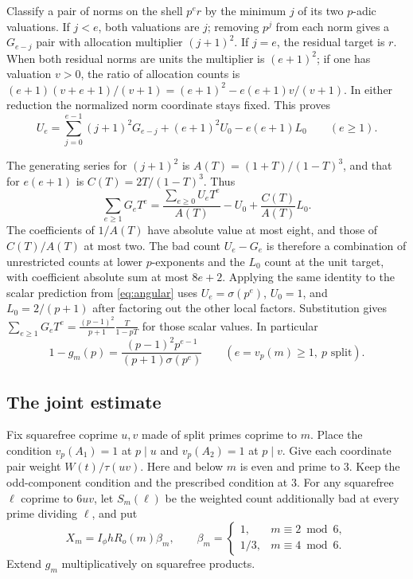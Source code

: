Classify a pair of norms on the shell \(p^e r\) by the minimum
\(j\) of its two \(p\)-adic valuations. If \(j<e\), both valuations
are \(j\); removing \(p^j\) from each norm gives a \(G_{e-j}\)
pair with allocation multiplier \((j+1)^2\). If \(j=e\), the
residual target is \(r\). When both residual norms are units
the multiplier is \((e+1)^2\); if one has valuation \(v>0\),
the ratio of allocation counts is
\((e+1)(v+e+1)/(v+1)=(e+1)^2-e(e+1)v/(v+1)\).
In either reduction the normalized norm coordinate stays fixed.
This proves
\begin{equation}\label{eq:recurrence}
 U_e=\sum_{j=0}^{e-1}(j+1)^2 G_{e-j}+(e+1)^2 U_0-e(e+1)L_0
 \qquad(e\ge1).
\end{equation}

The generating series for \((j+1)^2\) is
\(A(T)=(1+T)/(1-T)^3\), and that for \(e(e+1)\) is
\(C(T)=2T/(1-T)^3\). Thus
\[
 \sum_{e\ge1}G_eT^e=\frac{\sum_{e\ge0}U_eT^e}{A(T)}
                     -U_0+\frac{C(T)}{A(T)}L_0 .
\]
The coefficients of \(1/A(T)\) have absolute value at most eight,
and those of \(C(T)/A(T)\) at most two. The bad count \(U_e-G_e\)
is therefore a combination of unrestricted counts at lower
\(p\)-exponents and the \(L_0\) count at the unit target, with
coefficient absolute sum at most \(8e+2\). Applying the same
identity to the scalar prediction from \eqref{eq:angular} uses
\(U_e=\sigma(p^e)\), \(U_0=1\), and \(L_0=2/(p+1)\) after
factoring out the other local factors. Substitution gives
\(\sum_{e\ge1}G_e T^e=\frac{(p-1)^2}{p+1}\frac{T}{1-pT}\)
for those scalar values. In particular
\begin{equation}\label{eq:split}
 1-g_m(p)=\frac{(p-1)^2p^{e-1}}{(p+1)\sigma(p^e)}
                 \qquad(e=v_p(m)\ge1,\ p\text{ split}).
\end{equation}

\subsection{The joint estimate}
Fix squarefree coprime \(u,v\) made of split primes coprime to
\(m\). Place the condition \(v_p(A_1)=1\) at \(p\mid u\) and
\(v_p(A_2)=1\) at \(p\mid v\). Give each coordinate pair weight
\(W(t)/\tau(uv)\). Here and below \(m\) is even and prime to \(3\).
Keep the odd-component condition and the prescribed condition
at \(3\). For any squarefree \(\ell\) coprime to \(6uv\), let
\(S_m(\ell)\) be the weighted count additionally bad at every
prime dividing \(\ell\), and put
\[
 X_m=I_\phi h R_o(m)\beta_m,\qquad
 \beta_m=\begin{cases}1,&m\equiv2\bmod6,\\1/3,&m\equiv4\bmod6.\end{cases}
\]
Extend \(g_m\) multiplicatively on squarefree products.

